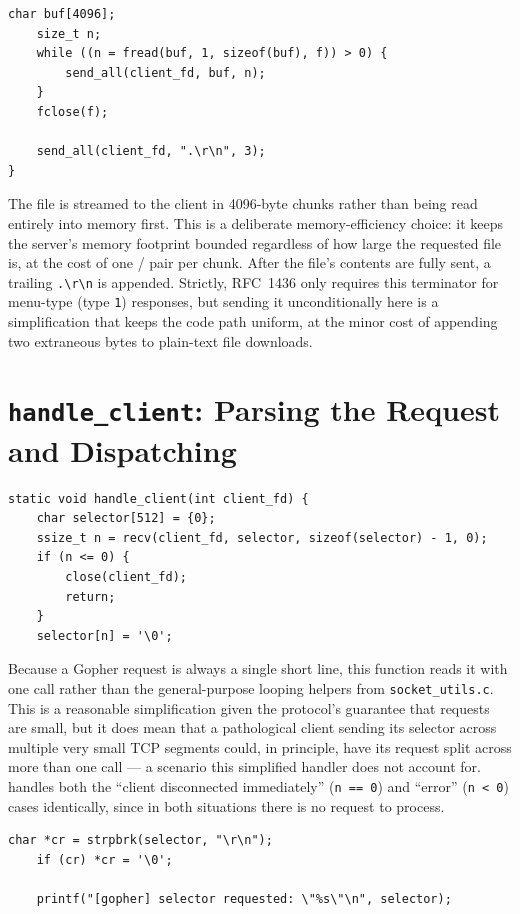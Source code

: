 \begin{lstlisting}[style=cstyle]
    char buf[4096];
    size_t n;
    while ((n = fread(buf, 1, sizeof(buf), f)) > 0) {
        send_all(client_fd, buf, n);
    }
    fclose(f);

    send_all(client_fd, ".\r\n", 3);
}
\end{lstlisting}

The file is streamed to the client in 4096-byte chunks rather than being read entirely into memory first. This is a deliberate memory-efficiency choice: it keeps the server's memory footprint bounded regardless of how large the requested file is, at the cost of one / pair per chunk. After the file's contents are fully sent, a trailing \texttt{.\textbackslash r\textbackslash n} is appended. Strictly, RFC~1436 only requires this terminator for menu-type (type \texttt{1}) responses, but sending it unconditionally here is a simplification that keeps the code path uniform, at the minor cost of appending two extraneous bytes to plain-text file downloads.

\section{\texttt{handle\_client}: Parsing the Request and Dispatching}

\begin{lstlisting}[style=cstyle]
static void handle_client(int client_fd) {
    char selector[512] = {0};
    ssize_t n = recv(client_fd, selector, sizeof(selector) - 1, 0);
    if (n <= 0) {
        close(client_fd);
        return;
    }
    selector[n] = '\0';
\end{lstlisting}

Because a Gopher request is always a single short line, this function reads it with one  call rather than the general-purpose looping helpers from \texttt{socket\_utils.c}. This is a reasonable simplification given the protocol's guarantee that requests are small, but it does mean that a pathological client sending its selector across multiple very small TCP segments could, in principle, have its request split across more than one  call --- a scenario this simplified handler does not account for.  handles both the ``client disconnected immediately'' (\texttt{n == 0}) and ``error'' (\texttt{n < 0}) cases identically, since in both situations there is no request to process.

\begin{lstlisting}[style=cstyle]
    char *cr = strpbrk(selector, "\r\n");
    if (cr) *cr = '\0';

    printf("[gopher] selector requested: \"%s\"\n", selector);
\end{lstlisting}

